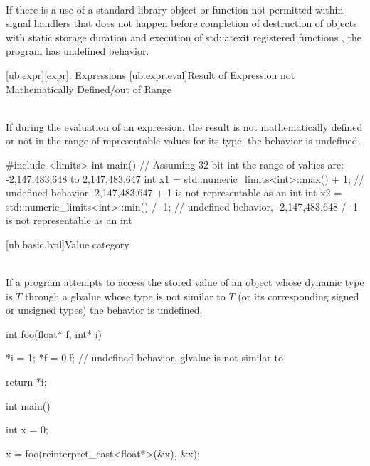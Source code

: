 \pnum
{} \\
If there is a use of a standard library object or function not permitted within signal handlers  that
does not happen before  completion of destruction of objects with static storage duration and execution
of std::atexit registered functions , the program has undefined behavior.

\pnum
\begin{example}
\begin{codeblock}
\end{codeblock}
\end{example}


[ub.expr]{\ref{expr}: Expressions}
[ub.expr.eval]{Result of Expression not Mathematically Defined/out of Range}

\pnum
{} \\
If during the evaluation of an expression, the result is not mathematically defined or not in the range of
representable values for its type, the behavior is undefined.

\pnum
\begin{example}
\begin{codeblock}
#include <limits>
int main() {
  // Assuming 32-bit int the range of values are: -2,147,483,648 to 2,147,483,647
  int x1 = std::numeric_limits<int>::max() + 1;     // undefined behavior, 2,147,483,647 + 1 is not representable as an int
  int x2 = std::numeric_limits<int>::min() / -1;    // undefined behavior, -2,147,483,648 / -1 is not representable as an int
}
\end{codeblock}
\end{example}

[ub.basic.lval]{Value category}

\pnum
{} \\
If a program attempts to access  the stored value of an object
whose dynamic type is $T$ through a glvalue whose type is not
similar  to $T$ (or its corresponding signed or unsigned types)
the behavior is undefined.

\pnum
\begin{example}
\begin{codeblock}
int foo(float* f, int* i) {
  *i = 1;
  *f = 0.f;     // undefined behavior, glvalue is not similar to 

  return *i;
}

int main() {
  int x = 0;

  x = foo(reinterpret_cast<float*>(&x), &x);
}
\end{codeblock}
\end{example}

